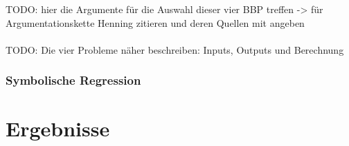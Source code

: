 TODO: hier die Argumente für die Auswahl dieser vier BBP treffen -> für Argumentationskette Henning zitieren und deren Quellen mit angeben\\
\cite{cui_equidistant_2023}\\


TODO: Die vier Probleme näher beschreiben: Inputs, Outputs und Berechnung

\subsubsection{Symbolische Regression}
\label{subsubsec:symbolicRegression}

\section{Ergebnisse}
\label{Ergebnisse}

